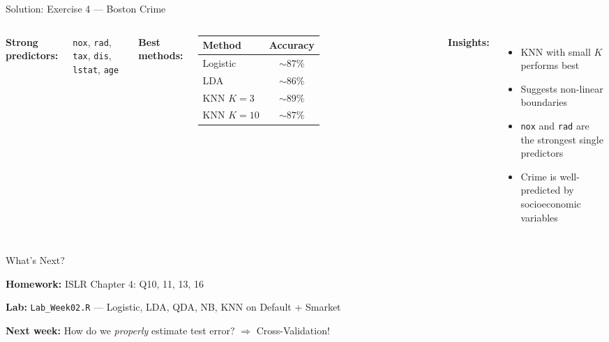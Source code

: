 \documentclass[aspectratio=169, 11pt]{beamer}
\begin{document}
\begin{frame}{Solution: Exercise 4 --- Boston Crime}
\begin{columns}
\textbf{Strong predictors:}

\texttt{nox}, \texttt{rad}, \texttt{tax}, \texttt{dis}, \texttt{lstat}, \texttt{age}

\vspace{0.3em}
\textbf{Best methods:}

\begin{tabular}{lc}
\toprule
Method & Accuracy \\
\midrule
Logistic & $\sim 87\%$ \\
LDA & $\sim 86\%$ \\
KNN $K=3$ & $\sim 89\%$ \\
KNN $K=10$ & $\sim 87\%$ \\
\bottomrule
\end{tabular}

\textbf{Insights:}

\begin{itemize}
  \item KNN with small $K$ performs best
  \item Suggests non-linear boundaries
  \item \texttt{nox} and \texttt{rad} are the strongest single predictors
  \item Crime is well-predicted by socioeconomic variables
\end{itemize}
\end{columns}
\end{frame}


\begin{frame}{What's Next?}

\begin{center}
\end{center}

\vspace{0.3em}
\textbf{Homework:} ISLR Chapter 4: Q10, 11, 13, 16

\textbf{Lab:} \texttt{Lab\_Week02.R} --- Logistic, LDA, QDA, NB, KNN on Default + Smarket

\textbf{Next week:} How do we \textit{properly} estimate test error? $\Rightarrow$ Cross-Validation!
\end{frame}
\end{document}
